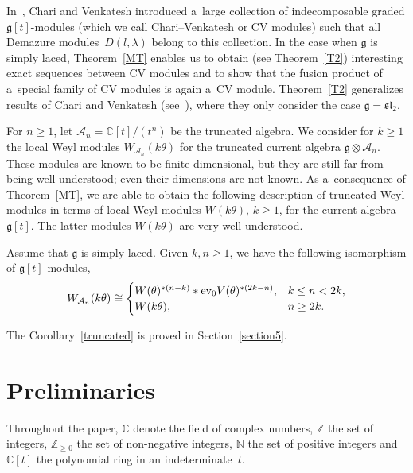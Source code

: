 \documentclass[pdftex]{sigma}
\numberwithin{equation}{section}
\begin{document}
In~\cite{CV}, Chari and Venkatesh introduced a~large collection of indecomposable graded $\mathfrak{g}[t]$-modules
(which we call Chari--Venkatesh or CV modules) such that all Demazure mo\-du\-les~$D(l, \lambda)$ belong to this collection.
In the case when $\mathfrak{g}$ is simply laced, Theorem~\ref{MT} enables us to obtain (see Theorem~\ref{T2})
interesting exact sequences between CV modules and to show that the fusion product of a~special family of CV modules is
again a~CV module.
Theorem~\ref{T2} generalizes results of Chari and Venkatesh (see~\cite[\S~6]{CV}), where they only consider the case $\mathfrak{g}=\mathfrak{sl}_2$.

For $n\geq 1$, let $\mathcal{A}_n=\mathbb{C}[t]/(t^n)$ be the truncated algebra.
We consider for $k\geq1$ the local Weyl modules $W_{\mathcal{A}_n}(k\theta)$ for the truncated current algebra
$\mathfrak{g}\otimes\mathcal{A}_n$.
These modules are known to be f\/inite-dimensional, but they are still far from being well understood; even their
dimensions are not known.
As a~consequence of Theorem~\ref{MT}, we are able to obtain the following description of truncated Weyl modules in terms
of local Weyl modules $W(k\theta)$, $k\geq 1$, for the current algebra~$\mathfrak{g}[t]$.
The latter modules $W(k\theta)$ are very well understood.
\begin{corollary}
\label{truncated}
Assume that $\mathfrak{g}$ is simply laced.
Given $k,n\geq 1$, we have the following isomorphism of $\mathfrak{g}[t]$-modules,
\begin{gather*}
W_{\mathcal{A}_n}(k\theta) \cong
\begin{cases}
W(\theta)^{*(n-k)} * \textup{ev}_0 V(\theta)^{*(2k-n)}, & k\leq n < 2k,
\\
W(k\theta), & n\geq 2k.
\end{cases}
\end{gather*}
\end{corollary}

 The Corollary~\ref{truncated} is proved in Section~\ref{section5}.



\section{Preliminaries}\label{section2}

Throughout the paper, $\mathbb{C}$ denote the f\/ield of complex numbers, $\mathbb{Z}$ the set of integers,
$\mathbb{Z}_{\geq 0}$ the set of non-negative integers, $\mathbb{N}$ the set of positive integers and $\mathbb{C}[t]$
the polynomial ring in an indeterminate~$t$.
\end{document}
